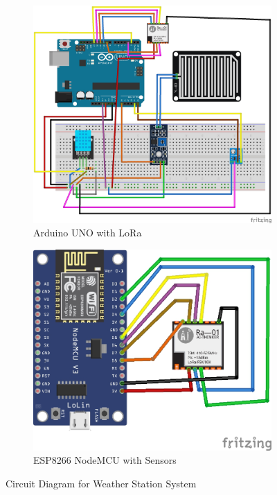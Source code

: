 \documentclass[conference, onecolumn]{IEEEtran}
\begin{document}
\begin{figure}[H]
    \centering
    \begin{subfigure}{0.45\textwidth}
        \centering
        \includegraphics[width=0.535\linewidth]{figures/Weather_Station_Arduino.jpg}
        \caption{Arduino UNO with LoRa}
        \label{fig:esp8266_lora}
    \end{subfigure}
    \hfill
    \begin{subfigure}{0.45\textwidth}
        \centering
        \includegraphics[width=0.535\linewidth]{figures/Weather_Station_ESP.jpg}
        \caption{ESP8266 NodeMCU with Sensors}
        \label{fig:arduino_sensors}
    \end{subfigure}
    \caption{Circuit Diagram for Weather Station System}
    \label{fig:weather_station}
\end{figure}
\end{document}
